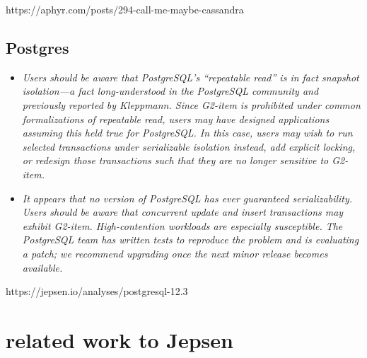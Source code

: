\documentclass[a4paper,10pt,titlepage]{report}
\begin{document}
    https://aphyr.com/posts/294-call-me-maybe-cassandra


    \subsection{Postgres}
    
    
    
    \begin{itemize}
        \item \textit{Users should be aware that PostgreSQL’s “repeatable read” is in fact snapshot isolation—a fact long-understood in the PostgreSQL community and previously reported by Kleppmann. Since G2-item is prohibited under common formalizations of repeatable read, users may have designed applications assuming this held true for PostgreSQL. In this case, users may wish to run selected transactions under serializable isolation instead, add explicit locking, or redesign those transactions such that they are no longer sensitive to G2-item.}
        \item \textit{It appears that no version of PostgreSQL has ever guaranteed serializability. Users should be aware that concurrent update and insert transactions may exhibit G2-item. High-contention workloads are especially susceptible. The PostgreSQL team has written tests to reproduce the problem and is evaluating a patch; we recommend upgrading once the next minor release becomes available.}
    \end{itemize}
    https://jepsen.io/analyses/postgresql-12.3

    \section{related work to Jepsen}
    




\end{document}
